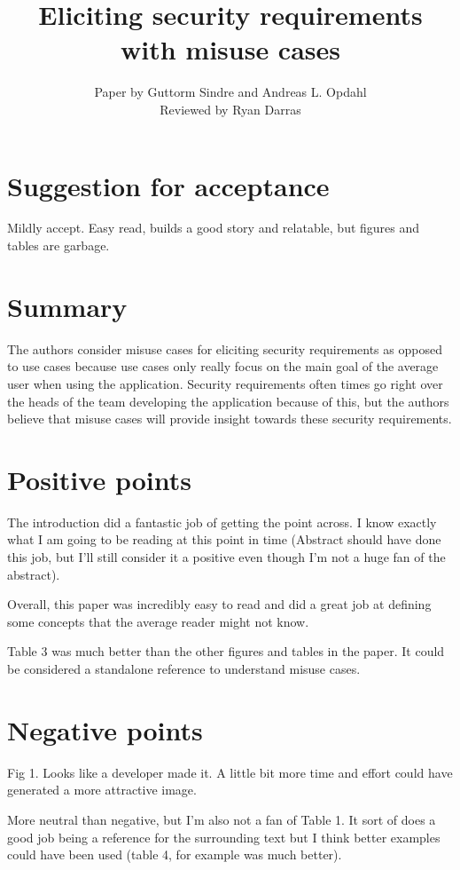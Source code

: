 \documentclass[11pt,twoside]{srcreprt}
\title{Eliciting security requirements with misuse cases}
\author{Paper by Guttorm Sindre and Andreas L. Opdahl\\Reviewed by Ryan Darras}
\begin{document}
\maketitle

\section{Suggestion for acceptance}
Mildly accept. Easy read, builds a good story and relatable, but figures and tables are garbage.

\section{Summary}
The authors consider misuse cases for eliciting security requirements as opposed to use cases because use cases only really focus on the main goal of the average user when using the application. Security requirements often times go right over the heads of the team developing the application because of this, but the authors believe that misuse cases will provide insight towards these security requirements.

\section{Positive points}
The introduction did a fantastic job of getting the point across. I know exactly what I am going to be reading at this point in time (Abstract should have done this job, but I'll still consider it a positive even though I'm not a huge fan of the abstract).

Overall, this paper was incredibly easy to read and did a great job at defining some concepts that the average reader might not know.

Table 3 was much better than the other figures and tables in the paper. It could be considered a standalone reference to understand misuse cases.




\section{Negative points}
Fig 1. Looks like a developer made it. A little bit more time and effort could have generated a more attractive image.

More neutral than negative, but I'm also not a fan of Table 1. It sort of does a good job being a reference for the surrounding text but I think better examples could have been used (table 4, for example was much better).
\end{document}
